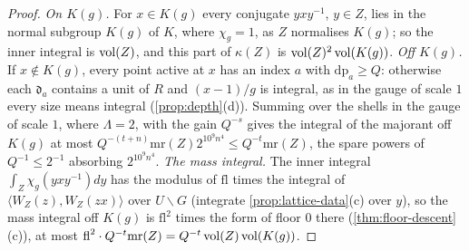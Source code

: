 \begin{proof}
\emph{On $K(g)$.} For $x\in K(g)$ every conjugate $yxy^{-1}$, $y\in Z$, lies in the normal subgroup $K(g)$ of $K$, where $\chi_g=1$, as $Z$ normalises $K(g)$; so the inner integral is $\operatorname{vol}(Z)$, and this part of $\kappa(Z)$ is $\operatorname{vol}(Z)^2\operatorname{vol}(K(g))$.
\emph{Off $K(g)$.} If $x\notin K(g)$, every point active at $x$ has an index $a$ with $\mathrm{dp}_a\ge Q$: otherwise each $\mathfrak d_a$ contains a unit of $R$ and $(x-1)/g$ is integral, as in the gauge of scale $1$ every size means integral
(\cref{prop:depth}(d)). Summing over the shells in the gauge of scale $1$, where $\Lambda=2$, with the gain $Q^{-s}$ gives the integral of the majorant off $K(g)$ at most $Q^{-(t+n)}\mathrm{mr}(Z)2^{10^9n^4}\le Q^{-t}\mathrm{mr}(Z)$, the spare powers of
$Q^{-1}\le2^{-1}$ absorbing $2^{10^9n^4}$. \emph{The mass integral.} The inner integral $\int_Z\chi_g(yxy^{-1})dy$ has the modulus of $\mathrm{fl}$ times the integral of $\langle W_Z(z),W_Z(zx)\rangle$ over $U\backslash G$ (integrate
\cref{prop:lattice-data}(c) over $y$), so the mass integral off $K(g)$ is $\mathrm{fl}^2$ times the form of floor $0$ there (\cref{thm:floor-descent}(c)), at most $\mathrm{fl}^2\cdot Q^{-t}\mathrm{mr}(Z)=Q^{-t}\operatorname{vol}(Z)\operatorname{vol}(K(g))$.
\end{proof}

